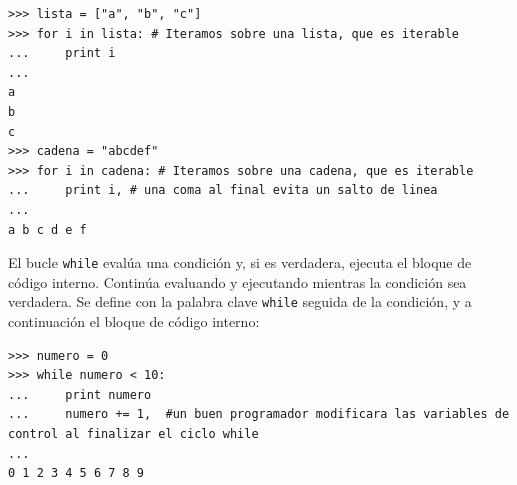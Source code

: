 \begin{lstlisting}
>>> lista = ["a", "b", "c"]
>>> for i in lista: # Iteramos sobre una lista, que es iterable
...     print i
...
a
b
c
>>> cadena = "abcdef"
>>> for i in cadena: # Iteramos sobre una cadena, que es iterable
...     print i, # una coma al final evita un salto de linea
...
a b c d e f
\end{lstlisting}



El bucle \verb~while~ evalúa una condición y, si es verdadera, ejecuta el bloque
de código interno. Continúa evaluando y ejecutando mientras la condición sea verdadera.
Se define con la palabra clave \verb~while~ seguida de la condición, y a continuación 
el bloque de código interno:
\begin{lstlisting}
>>> numero = 0
>>> while numero < 10:
...     print numero
...     numero += 1,  #un buen programador modificara las variables de control al finalizar el ciclo while
...
0 1 2 3 4 5 6 7 8 9
\end{lstlisting}


% 
%  
%  
% 
% 
% 






